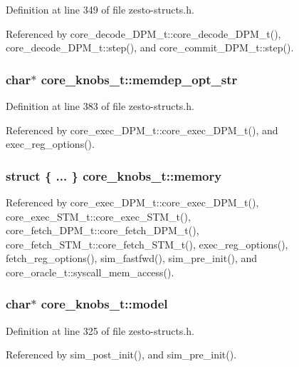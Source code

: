 Definition at line 349 of file zesto-structs.h.

Referenced by core\_\-decode\_\-DPM\_\-t::core\_\-decode\_\-DPM\_\-t(), core\_\-decode\_\-DPM\_\-t::step(), and core\_\-commit\_\-DPM\_\-t::step().
\subsubsection[{memdep\_\-opt\_\-str}]{\setlength{\rightskip}{0pt plus 5cm}char$\ast$ {\bf core\_\-knobs\_\-t::memdep\_\-opt\_\-str}}\label{structcore__knobs__t_925b29ffee0615d4f8f59f66ada01eaa}




Definition at line 383 of file zesto-structs.h.

Referenced by core\_\-exec\_\-DPM\_\-t::core\_\-exec\_\-DPM\_\-t(), and exec\_\-reg\_\-options().
\subsubsection[{memory}]{\setlength{\rightskip}{0pt plus 5cm}struct \{ ... \}   {\bf core\_\-knobs\_\-t::memory}}\label{structcore__knobs__t_cb7140c829f3ecf6ce521d84c327ecb5}




Referenced by core\_\-exec\_\-DPM\_\-t::core\_\-exec\_\-DPM\_\-t(), core\_\-exec\_\-STM\_\-t::core\_\-exec\_\-STM\_\-t(), core\_\-fetch\_\-DPM\_\-t::core\_\-fetch\_\-DPM\_\-t(), core\_\-fetch\_\-STM\_\-t::core\_\-fetch\_\-STM\_\-t(), exec\_\-reg\_\-options(), fetch\_\-reg\_\-options(), sim\_\-fastfwd(), sim\_\-pre\_\-init(), and core\_\-oracle\_\-t::syscall\_\-mem\_\-access().
\subsubsection[{model}]{\setlength{\rightskip}{0pt plus 5cm}char$\ast$ {\bf core\_\-knobs\_\-t::model}}\label{structcore__knobs__t_38c1182c9de1cdd5d705fa5eb90dd5ab}




Definition at line 325 of file zesto-structs.h.

Referenced by sim\_\-post\_\-init(), and sim\_\-pre\_\-init().
